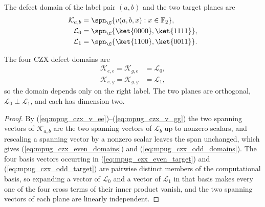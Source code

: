 \begin{definition}
    \label{def:mpug_czx_defect_domains}
    \leanok
    The defect domain of the label pair $(a,b)$ and the two target planes are
    \begin{align}
        \mathcal K_{a,b} & =\spn_{\C}\{v(a,b,x):x\in\mathbb F_2\},
        \label{eq:mpug_czx_domain}                                 \\
        \mathcal L_0     & =\spn_{\C}\{\ket{0000},\ket{1111}\},
        \label{eq:mpug_czx_even_target}                            \\
        \mathcal L_1     & =\spn_{\C}\{\ket{1100},\ket{0011}\}.
        \label{eq:mpug_czx_odd_target}
    \end{align}
\end{definition}

\begin{lemma}
    \label{thm:mpug_czx_defect_domains}
    \leanok
    The four CZX defect domains are
    \begin{align}
        \mathcal K_{e,e}=\mathcal K_{g,e} & =\mathcal L_0,
        \label{eq:mpug_czx_even_domains}                   \\
        \mathcal K_{e,g}=\mathcal K_{g,g} & =\mathcal L_1,
        \label{eq:mpug_czx_odd_domains}
    \end{align}
    so the domain depends only on the right label. The two planes are
    orthogonal, $\mathcal L_0\perp\mathcal L_1$, and each has dimension two.
\end{lemma}

\begin{proof}\leanok
    By (\ref{eq:mpug_czx_v_ee})--(\ref{eq:mpug_czx_v_gg}) the two spanning
    vectors of $\mathcal K_{a,b}$ are the two spanning vectors of
    $\mathcal L_b$ up to nonzero scalars, and rescaling a spanning vector by a
    nonzero scalar leaves the span unchanged, which gives
    (\ref{eq:mpug_czx_even_domains}) and (\ref{eq:mpug_czx_odd_domains}). The
    four basis vectors occurring in (\ref{eq:mpug_czx_even_target}) and
    (\ref{eq:mpug_czx_odd_target}) are pairwise distinct members of the
    computational basis, so expanding a vector of $\mathcal L_0$ and a vector
    of $\mathcal L_1$ in that basis makes every one of the four cross terms of
    their inner product vanish, and the two spanning vectors of each plane are
    linearly independent.
\end{proof}

